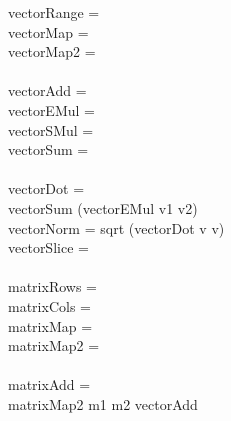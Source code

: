 \begin{figure}[t]
\hfill\begin{minipage}{.75\textwidth}\raggedright
{} vectorRange =  
\\
 vectorMap =  
\\
 vectorMap2 = 
\\
\tabt 
{}
\\
 vectorAdd = 
\\
 vectorEMul = 
\\
 vectorSMul = 
\\
 vectorSum = \\
\tabt {}
\\
 vectorDot = \\
\tabt
vectorSum (vectorEMul v1 v2)
\\
 vectorNorm = 
sqrt (vectorDot v v)
\\
 vectorSlice =  \\
\tabt {}
\\
 matrixRows =   
\\
 matrixCols =   
\\
 matrixMap = 
\\
 matrixMap2 = 
\\
\tabt 
{}
\\
 matrixAdd = 
\\
\tabt
matrixMap2 m1 m2 vectorAdd
\\

\end{minipage}
\end{figure}
